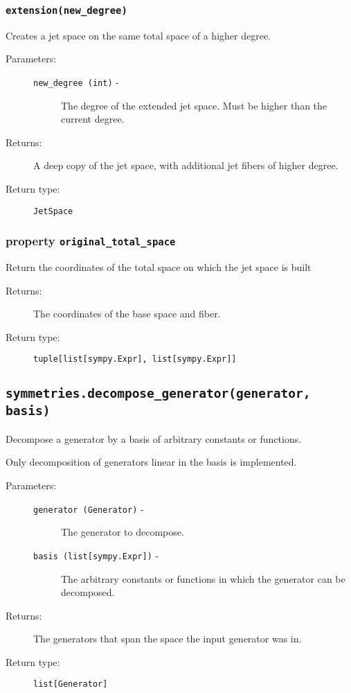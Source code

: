   \subsubsection*{\lstinline{extension(new_degree)}}

      Creates a jet space on the same total space of a higher degree.

      \begin{description}
         \item[Parameters:] \leavevmode
           \begin{description}
               \item[\lstinline{new_degree (int)} -] The degree of the extended jet space. Must be higher than the current degree.
           \end{description}
         \item[Returns:] A deep copy of the jet space, with additional jet fibers of higher degree.
         \item[Return type:] \lstinline{JetSpace}
      \end{description}

   \subsubsection*{property \lstinline{original_total_space}}

      Return the coordinates of the total space on which the jet
      space is built

      \begin{description}
         \item[Returns:] The coordinates of the base space and fiber.
         \item[Return type:] \lstinline{tuple[list[sympy.Expr], list[sympy.Expr]]}
      \end{description}         

\subsection*{\lstinline{symmetries.decompose_generator(generator, basis)}}

   Decompose a generator by a basis of arbitrary constants or
   functions.

   Only decomposition of generators linear in the basis is
   implemented.

   \begin{description}
      \item[Parameters:] \leavevmode
        \begin{description}
            \item[\lstinline{generator (Generator)} -] The generator to decompose.
            \item[\lstinline{basis (list[sympy.Expr])} -] The arbitrary constants or functions in which the generator can be decomposed.
        \end{description}
      \item[Returns:] The generators that span the space the input generator was in.
      \item[Return type:] \lstinline{list[Generator]}
   \end{description}

